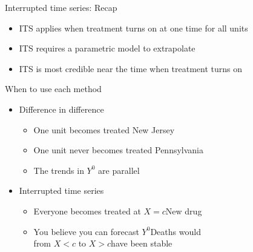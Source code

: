 \documentclass{beamer}
\begin{document}
\begin{frame}{Interrupted time series: Recap}
\begin{itemize}
\item ITS applies when treatment turns on at one time for all units
\item ITS requires a parametric model to extrapolate
\item ITS is most credible near the time when treatment turns on
\end{itemize}
\end{frame}

\begin{frame}{When to use each method}
\begin{itemize}\setlength\itemsep{.5em}\small
\item Difference in difference
\begin{itemize}\setlength\itemsep{.1em}\footnotesize
\item One unit becomes treated \hfill New Jersey
\item One unit never becomes treated \hfill Pennsylvania
\item The trends in $Y^0$ are parallel
\end{itemize}
\item Interrupted time series
\begin{itemize}\setlength\itemsep{.1em}\footnotesize
\item Everyone becomes treated at $X = c$\hfill New drug
\item You believe you can forecast $Y^0$\hfill Deaths would\\from $X < c$ to $X > c$\hfill have been stable
\end{itemize}
\end{itemize}
\end{frame}
\end{document}
